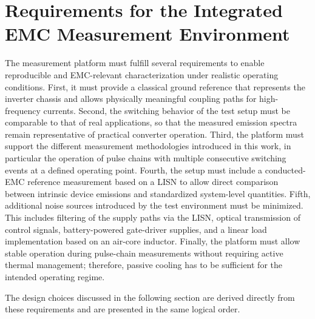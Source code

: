 
\section{Requirements for the Integrated EMC Measurement Environment}

The measurement platform must fulfill several requirements to enable reproducible and EMC-relevant characterization under realistic operating conditions.
First, it must provide a classical ground reference that represents the inverter chassis and allows physically meaningful coupling paths for high-frequency currents.
Second, the switching behavior of the test setup must be comparable to that of real applications, so that the measured emission spectra remain representative of practical converter operation.
Third, the platform must support the different measurement methodologies introduced in this work, in particular the operation of pulse chains with multiple consecutive switching events at a defined operating point.
Fourth, the setup must include a conducted-EMC reference measurement based on a LISN to allow direct comparison between intrinsic device emissions and standardized system-level quantities.
Fifth, additional noise sources introduced by the test environment must be minimized.
This includes filtering of the supply paths via the LISN, optical transmission of control signals, battery-powered gate-driver supplies, and a linear load implementation based on an air-core inductor.
Finally, the platform must allow stable operation during pulse-chain measurements without requiring active thermal management; therefore, passive cooling has to be sufficient for the intended operating regime.

The design choices discussed in the following section are derived directly from these requirements and are presented in the same logical order.
